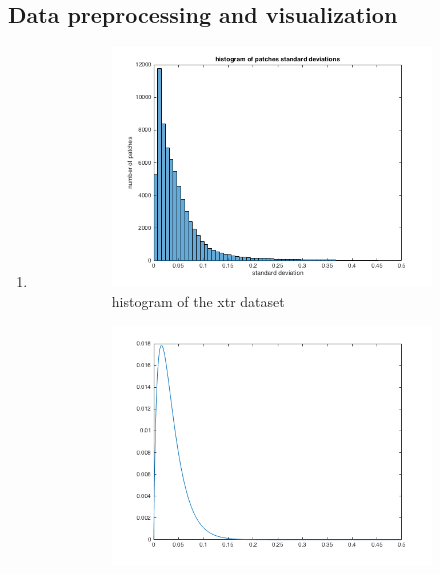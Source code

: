 \documentclass{article}
\begin{document}
		\subsection{Data preprocessing and visualization}
			 \begin{enumerate}[label=(\alph*)]
			 	\item
				 	\begin{figure}[htbp]
				 		\centering
				 		\caption{standard deviations in the xtr dataset}
				 		\label{fig:patch_images}
				 		\begin{subfigure}{0.5\textwidth}
				 			\includegraphics[width=\linewidth]{images/p1-1-a_std_hist}
				 			\caption{histogram of the xtr dataset}
				 			\label{fig:p1-1-a_std_hist}
				 		\end{subfigure}%
				 		\begin{subfigure}{0.5\textwidth}
				 			\includegraphics[width=\linewidth]{images/p1-1-a_dist}

\end{subfigure}
\end{figure}
\end{enumerate}
\end{document}

